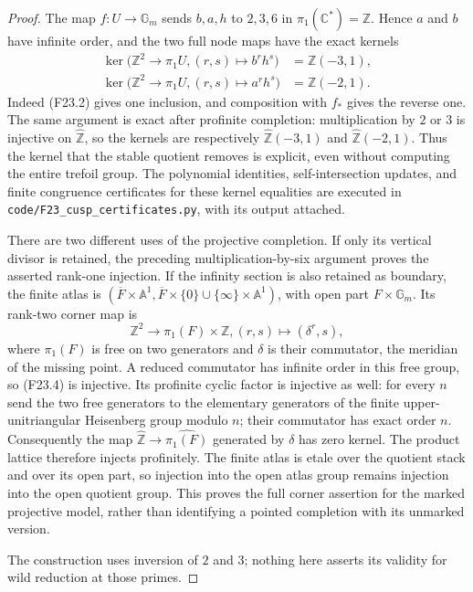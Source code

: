 \begin{proof}
The map $f:U\to\mathbb G_m$ sends $b,a,h$ to $2,3,6$ in
$\pi_1(\mathbb C^*)=\mathbb Z$. Hence $a$ and $b$ have infinite
order, and the two full node maps have the exact kernels
\[
 \begin{split}
 \ker\bigl(\mathbb Z^2\longrightarrow\pi_1U,
                      (r,s)\longmapsto b^r h^s\bigr)
       &=\mathbb Z(-3,1),\\
 \ker\bigl(\mathbb Z^2\longrightarrow\pi_1U,
                      (r,s)\longmapsto a^r h^s\bigr)
       &=\mathbb Z(-2,1).
 \end{split}                                             \tag{F23.3}
\]
Indeed (F23.2) gives one inclusion, and composition with $f_*$
gives the reverse one. The same argument is exact after profinite
completion: multiplication by $2$ or $3$ is injective on
$\widehat{\mathbb Z}$, so the kernels are respectively
$\widehat{\mathbb Z}(-3,1)$ and
$\widehat{\mathbb Z}(-2,1)$. Thus the kernel that the stable
quotient removes is explicit, even without computing the entire
trefoil group. The polynomial identities, self-intersection updates,
and finite congruence certificates for these kernel equalities are
executed in \texttt{code/F23\_cusp\_certificates.py}, with its output
attached.

There are two different uses of the projective completion.
If only its vertical divisor is retained, the preceding
multiplication-by-six argument proves the asserted rank-one
injection. If the infinity section is also retained as boundary,
the finite atlas is
$(\overline F\times\mathbb A^1,
  \overline F\times\{0\}\cup\{\infty\}\times\mathbb A^1)$,
with open part $F\times\mathbb G_m$. Its rank-two corner map is
\[
 \mathbb Z^2\longrightarrow \pi_1(F)\times\mathbb Z,
                  (r,s)\longmapsto (\delta^r,s),           \tag{F23.4}
\]
where $\pi_1(F)$ is free on two generators and $\delta$ is their
commutator, the meridian of the missing point. A reduced commutator
has infinite order in this free group, so (F23.4) is injective.
Its profinite cyclic factor is injective as well: for every $n$
send the two free generators to the elementary generators of the
finite upper-unitriangular Heisenberg group modulo $n$; their
commutator has exact order $n$. Consequently the map
$\widehat{\mathbb Z}\to\widehat{\pi_1(F)}$ generated by $\delta$
has zero kernel. The product lattice therefore injects profinitely.
The finite atlas is etale over the quotient stack and over its open
part, so injection into the open atlas group remains injection into
the open quotient group. This proves the full corner assertion for
the marked projective model, rather than identifying a pointed
completion with its unmarked version.


The construction uses inversion of $2$ and $3$; nothing here asserts
its validity for wild reduction at those primes.
\end{proof}

